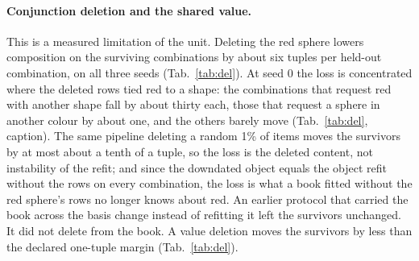 \documentclass{article} %
\begin{document}
\paragraph{Conjunction deletion and the shared value.} This is a
measured limitation of the unit. Deleting the red sphere lowers composition on the surviving combinations
by about six tuples per held-out combination, on all three seeds (Tab.~\ref{tab:del}). At seed 0 the loss is concentrated where %
the deleted rows tied red to a shape: the combinations that request red with another shape fall by %
about thirty each, those that request a sphere in another colour by about one, and the others barely move %
(Tab.~\ref{tab:del}, caption). The same pipeline deleting a random 1\% of items moves the survivors by at most about a tenth of a tuple, %
so the loss is the deleted content, not instability of the refit; and since the %
downdated object equals the object refit without the rows on every combination, the loss is what a book
fitted without the red sphere's rows no longer knows about red. An earlier protocol that carried the
book across the basis change instead of refitting it left the survivors unchanged. It did
not delete from the book. A value deletion moves the survivors %
by less than the declared one-tuple margin (Tab.~\ref{tab:del}). %
\end{document}
